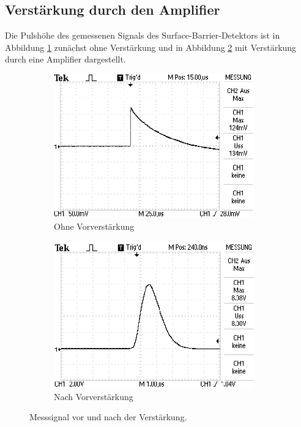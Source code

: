 \subsection{Verstärkung durch den Amplifier}
Die Pulshöhe des gemessenen Signals des Surface-Barrier-Detektors ist in Abbildung \ref{fig:ohne} zunächst ohne Verstärkung und in Abbildung \ref{fig:mit} mit Verstärkung durch eine Amplifier dargestellt. 
\begin{figure}[H]
\centering
\begin{subfigure}{.5\textwidth}
	\centering
	\includegraphics[width=0.95\textwidth]{ressources/ohne.png}
	\caption{Ohne Vorverstärkung}
	\label{fig:ohne}
\end{subfigure}%
\begin{subfigure}{.5\textwidth}
	\centering
	\includegraphics[width=0.95\textwidth]{ressources/mit.png}
	\caption{Nach Vorverstärkung}
	\label{fig:mit}
\end{subfigure}
\caption{Messsignal vor und nach der Verstärkung.}
\label{fig:calib}
\end{figure}

